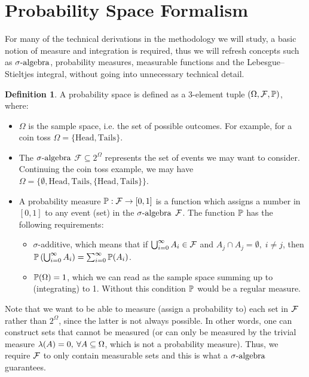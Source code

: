 \documentclass[a4paper,12pt,twoside,openright]{report}
\theoremstyle{definition}
\newtheorem{definition}{Definition}[section]
\begin{document}
\section{Probability Space Formalism}

For many of the technical derivations in the methodology we will study, a basic notion of measure and integration is required, thus we will refresh concepts such as $\sigalg$, probability measures,  measurable functions and the Lebesgue–Stieltjes integral, without going into unnecessary technical detail.

\begin{definition} \label{def:prob_space}
A probability space is defined as a 3-element tuple $\probspace$, where:
\begin{itemize}
    \item $\Omega$ is the sample space, i.e. the set of possible outcomes. For example, for a coin toss $\Omega=\{\text{Head}, \text{Tails}\}$. 
    \item The $\sigalg$ $\mathcal{F} \subseteq 2^{\Omega}$ represents the set of events we may want to consider. Continuing the coin toss example, we may have $\Omega=\{\emptyset, \text{Head}, \text{Tails},\{\text{Head}, \text{Tails}\}\}$.
    \item A probability measure $\P:\calF \rightarrow [0,1]$ is a function which assigns a number in $[0,1]$ to any event (set) in the $\sigalg$ $\calF$. The function $\P$ has the following requirements:
    \begin{itemize}
        \item $\sigma$-additive, which means that if  $\bigcup_{i=0}^\infty  A_i\in \calF$ and $A_j \cap A_j = \emptyset, \; i \neq j$, then $\P\left(\bigcup_{i=0}^\infty A_i\right) =\sum_{i=0}^\infty \P(A_i) $.
        \item $\P(\Omega)=1$, which we can read as the sample space summing up to (integrating) to 1.  Without this condition $\P$ would be a regular measure.
    \end{itemize}
\end{itemize}
\end{definition}
Note that we want to be able to measure (assign a probability to) each set in $\calF$ rather than $2^\Omega$, since the latter is not always possible. In other words, one can construct sets that cannot be measured (or can only be measured by the trivial measure $\callambda(A) = 0,\:\forall A \subseteq \Omega$, which is not a probability measure). Thus, we require $\calF$ to only contain measurable sets and this is what a $\sigalg$ guarantees.
\end{document}
